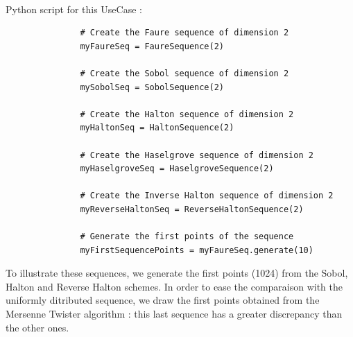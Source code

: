              \textspace\\
             Python  script for this UseCase :

             \begin{lstlisting}
               # Create the Faure sequence of dimension 2
               myFaureSeq = FaureSequence(2)

               # Create the Sobol sequence of dimension 2
               mySobolSeq = SobolSequence(2)

               # Create the Halton sequence of dimension 2
               myHaltonSeq = HaltonSequence(2)

               # Create the Haselgrove sequence of dimension 2
               myHaselgroveSeq = HaselgroveSequence(2)

               # Create the Inverse Halton sequence of dimension 2
               myReverseHaltonSeq = ReverseHaltonSequence(2)

               # Generate the first points of the sequence
               myFirstSequencePoints = myFaureSeq.generate(10)
             \end{lstlisting}


             To illustrate these sequences, we generate the first points (1024) from the Sobol, Halton and Reverse Halton schemes. In order to ease the comparaison with the uniformly ditributed sequence, we draw the first points obtained from the Mersenne Twister algorithm : this last sequence has a greater discrepancy than the other ones.



